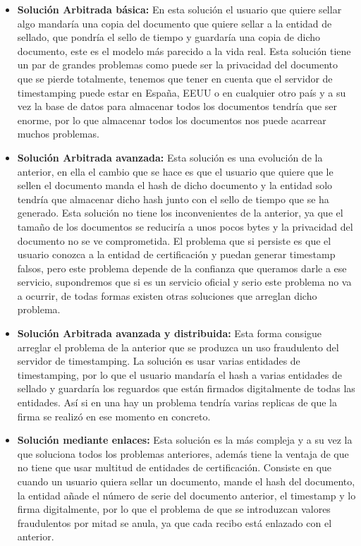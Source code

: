 \begin{itemize}

\item \textbf{Solución Arbitrada básica:} En esta solución el usuario que quiere sellar algo mandaría una copia del documento que quiere sellar a la entidad de sellado, que pondría el sello de tiempo y guardaría una copia de dicho documento, este es el modelo más parecido a la vida real. Esta solución tiene un par de grandes problemas como puede ser la privacidad del documento que se pierde totalmente, tenemos que tener en cuenta que el servidor de timestamping puede estar en España, EEUU o en cualquier otro país y a su vez la base de datos para almacenar todos los documentos tendría que ser enorme, por lo que almacenar todos los documentos nos puede acarrear muchos problemas.

\item \textbf{Solución Arbitrada avanzada:} Esta solución es una evolución de la anterior, en ella el cambio que se hace es que el usuario que quiere que le sellen el documento manda el hash de dicho documento y la entidad solo tendría que almacenar dicho hash junto con el sello de tiempo que se ha generado. Esta solución no tiene los inconvenientes de la anterior, ya que el tamaño de los documentos se reduciría a unos pocos bytes y la privacidad del documento no se ve comprometida. El problema que si persiste es que el usuario conozca a la entidad de certificación y puedan generar timestamp falsos, pero este problema depende de la confianza que queramos darle a ese servicio, supondremos que si es un servicio oficial y serio este problema no va a ocurrir, de todas formas existen otras soluciones que arreglan dicho problema.

\item \textbf{Solución Arbitrada avanzada y distribuida:} Esta forma consigue arreglar el problema de la anterior que se produzca un uso fraudulento del servidor de timestamping. La solución es usar varias entidades de timestamping, por lo que el usuario mandaría el hash a varias entidades de sellado y guardaría los reguardos que están firmados digitalmente de todas las entidades. Así si en una hay un problema tendría varias replicas de que la firma se realizó en ese momento en concreto.

\item \textbf{Solución mediante enlaces:} Esta solución es la más compleja y a su vez la que soluciona todos los problemas anteriores, además tiene la ventaja de que no tiene que usar multitud de entidades de certificación. Consiste en que cuando un usuario quiera sellar un documento, mande el hash del documento, la entidad añade el número de serie del documento anterior, el timestamp y lo firma digitalmente, por lo que el problema de que se introduzcan valores fraudulentos por mitad se anula, ya que cada recibo está enlazado con el anterior.
\end{itemize}

